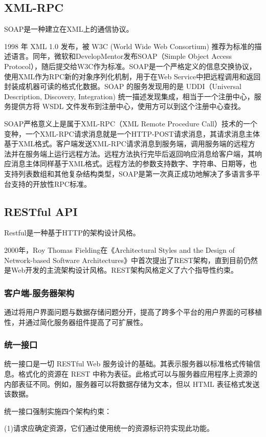 \documentclass[a4paper,twoside]{scrbook}
\begin{document}
\begin{CJK}{UTF8}{gbsn}
\subsection{XML-RPC}
SOAP是一种建立在XML上的通信协议。

1998 年 XML 1.0 发布，被 W3C (World Wide Web Consortium) 推荐为标准的描述语言。同年，微软和DevelopMentor发布SOAP（Simple Object Access Protocol），随后提交给W3C作为标准。SOAP是一个严格定义的信息交换协议，使用XML作为RPC新的对象序列化机制，用于在Web Service中把远程调用和返回封装成机器可读的格式化数据。SOAP 的服务发现用的是 UDDI（Universal Description, Discovery, Integration) 统一描述发现集成，相当于一个注册中心，服务提供方将 WSDL 文件发布到注册中心，使用方可以到这个注册中心查找。

SOAP严格意义上是属于XML-RPC（XML Remote Procedure Call）技术的一个变种，一个XML-RPC请求消息就是一个HTTP-POST请求消息，其请求消息主体基于XML格式。客户端发送XML-RPC请求消息到服务端，调用服务端的远程方法并在服务端上运行远程方法。远程方法执行完毕后返回响应消息给客户端，其响应消息主体同样基于XML格式。远程方法的参数支持数字、字符串、日期等，也支持列表数组和其他复杂结构类型，SOAP是第一次真正成功地解决了多语言多平台支持的开放性RPC标准。
\subsection{RESTful API}
Restful是一种基于HTTP的架构设计风格。

2000年，Roy Thomas Fielding在《Architectural Styles and the Design of Network-based Software Architectures》\cite{fielding2000architectural}中首次提出了REST架构，直到目前仍然是Web开发的主流架构设计风格。REST架构风格定义了六个指导性约束。
\subsubsection{客户端-服务器架构}
通过将用户界面问题与数据存储问题分开，提高了跨多个平台的用户界面的可移植性，并通过简化服务器组件提高了可扩展性。
\subsubsection{统一接口}
统一接口是一切 RESTful Web 服务设计的基础。其表示服务器以标准格式传输信息。格式化的资源在 REST 中称为表征。此格式可以与服务器应用程序上资源的内部表征不同。例如，服务器可以将数据存储为文本，但以 HTML 表征格式发送该数据。

统一接口强制实施四个架构约束：

(1)请求应确定资源，它们通过使用统一的资源标识符实现此功能。


\end{CJK}
\end{document}
